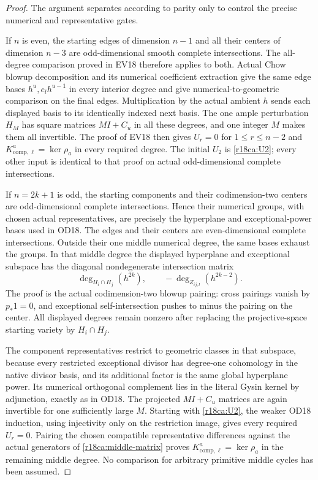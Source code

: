 \begin{proof}
The argument separates according to parity only to control
the precise numerical and representative gates.

If $n$ is even, the starting edges of dimension $n-1$ and
all their centers of dimension $n-3$ are odd-dimensional
smooth complete intersections.  The all-degree comparison
proved in EV18 therefore applies to both.  Actual Chow
blowup decomposition and its numerical coefficient extraction
give the same edge bases $h^u,e_lh^{u-1}$ in every interior
degree and give numerical-to-geometric comparison on the
final edges.  Multiplication by the actual ambient $h$ sends
each displayed basis to its identically indexed next basis.
The one ample perturbation $H_M$ has square matrices $MI+C_u$
in all these degrees, and one integer $M$ makes them all
invertible.  The proof of EV18 then gives $U_r=0$ for
$1\le r\le n-2$ and $K_{\mathrm{comp},\ell}^a=\ker\rho_a$
in every required degree.  The initial $U_2$ is
\eqref{r18ca:U2}; every other input is identical to that
proof on actual odd-dimensional complete intersections.

If $n=2k+1$ is odd, the starting components and their
codimension-two centers are odd-dimensional complete
intersections.  Hence their numerical groups, with chosen
actual representatives, are precisely the hyperplane and
exceptional-power bases used in OD18.
The edges and their centers are even-dimensional complete
intersections.  Outside their one middle numerical degree,
the same bases exhaust the groups.  In that middle degree
the displayed hyperplane and exceptional subspace has the
diagonal nondegenerate intersection matrix
\[
       \deg_{H_i\cap H_j}(h^{2k}),\qquad
                    -\deg_{Z_{ij,l}}(h^{2k-2}).
 \tag{CA18.8}\label{r18ca:middle-matrix}
\]
The proof is the actual codimension-two blowup pairing:
cross pairings vanish by $p_*1=0$, and exceptional
self-intersection pushes to minus the pairing on the center.
All displayed degrees remain nonzero after replacing the
projective-space starting variety by $H_i\cap H_j$.

The component representatives restrict to geometric classes
in that subspace, because every restricted exceptional divisor
has degree-one cohomology in the native divisor basis, and
its additional factor is the same global hyperplane power.
Its numerical orthogonal complement lies in the literal
Gysin kernel by adjunction, exactly as in OD18.
The projected $MI+C_u$ matrices are again invertible for
one sufficiently large $M$.  Starting with
\eqref{r18ca:U2}, the weaker OD18 induction, using injectivity
only on the restriction image, gives every required $U_r=0$.
Pairing the chosen compatible representative differences
against the actual generators of \eqref{r18ca:middle-matrix}
proves $K_{\mathrm{comp},\ell}^a=\ker\rho_a$ in the remaining
middle degree.  No comparison for arbitrary primitive
middle cycles has been assumed.


\end{proof}
